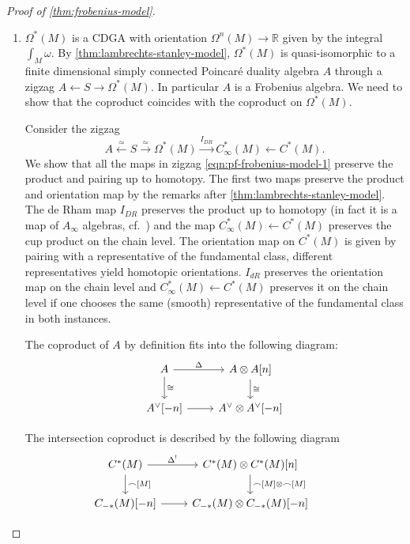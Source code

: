 \documentclass{scrartcl}
\theoremstyle{plain}
\theoremstyle{definition}
\newcommand{\R}{\mathbb R}
\newcommand{\capp}{\mathbin{\frown}}
\newcommand{\iso}{\cong}
\newcommand{\quiso}{\simeq}
\newcommand{\from}{\leftarrow}
\let\xto\xrightarrow
\let\xfrom\xleftarrow
\begin{document}
\begin{proof}[Proof of \cref{thm:frobenius-model}]
    \begin{enumerate}
        \item 
    $\Omega^*(M)$ is a CDGA with orientation $\Omega^n(M)\to \R$ given by the integral $\int_M\omega$. By \cref{thm:lambrechts-stanley-model}, $\Omega^*(M)$ is quasi-isomorphic to a finite dimensional simply connected Poincaré duality algebra $A$ through a zigzag $A\from S\to \Omega^*(M)$. In particular $A$ is a Frobenius algebra. We need to show that the coproduct coincides with the coproduct on $\Omega^*(M)$. 


    Consider the zigzag 
    \begin{equation}A\xfrom{\quiso} S \xto{\quiso} \Omega^*(M)\xto{I_{DR}} C^*_\infty(M) \from C^*(M).\label{eqn:pf-frobenius-model-1}\end{equation} 
    We show that all the maps in zigzag \ref{eqn:pf-frobenius-model-1} preserve the product and pairing up to homotopy. The first two maps preserve the product and orientation map by the remarks after \cref{thm:lambrechts-stanley-model}. The de Rham map $I_{DR}$ preserves the product up to homotopy (in fact it is a map of $A_\infty$ algebras, cf.\ \cite{gugenheim1977chen}) and the map $C^*_\infty(M) \from C^*(M)$ preserves the cup product on the chain level. The orientation map on $C^*(M)$ is given by pairing with a representative of the fundamental class, different representatives yield homotopic orientations. $I_{dR}$ preserves the orientation map on the chain level and $C^*_\infty(M) \from C^*(M)$ preserves it on the chain level if one chooses the same (smooth) representative of the fundamental class in both instances. 

    The coproduct of $A$ by definition fits into the following diagram:
    \begin{equation}\label{diag:pf-frobenius-model-1}
        \begin{tikzcd}
            A \dar["\iso"]\rar["\Delta"] & A\otimes A[n] \dar["\iso"] \\
            A^\vee[-n] \rar & A^\vee\otimes A^\vee[-n]
        \end{tikzcd}
    \end{equation}

    The intersection coproduct is described by the following diagram
    \begin{equation}\label{diag:pf-frobenius-model-2}
    \begin{tikzcd}
    C^*(M) \dar["\capp {[M]}"] \rar["\Delta^!"] & C^{*}(M)\otimes C^*(M)[n] \dar["\capp{[M]}\otimes\capp{[M]}"] \\
    C_{-*}(M)[-n] \rar & C_{-*}(M)\otimes C_{-*}(M)[-n] &
    \end{tikzcd}
    \end{equation}


\end{enumerate}
\end{proof}
\end{document}
